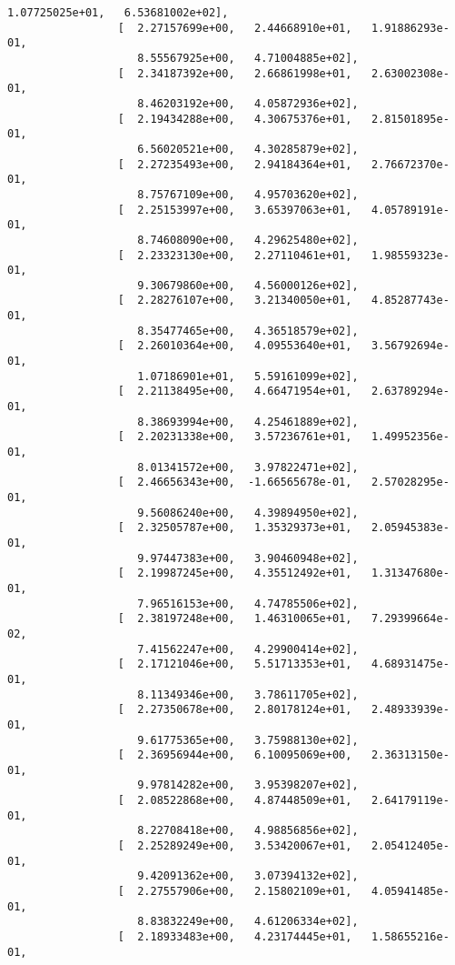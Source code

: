 \documentclass[11pt]{article}
\begin{document}
\begin{Verbatim}[commandchars=\\\{\}]
                    1.07725025e+01,   6.53681002e+02],
                 [  2.27157699e+00,   2.44668910e+01,   1.91886293e-01,
                    8.55567925e+00,   4.71004885e+02],
                 [  2.34187392e+00,   2.66861998e+01,   2.63002308e-01,
                    8.46203192e+00,   4.05872936e+02],
                 [  2.19434288e+00,   4.30675376e+01,   2.81501895e-01,
                    6.56020521e+00,   4.30285879e+02],
                 [  2.27235493e+00,   2.94184364e+01,   2.76672370e-01,
                    8.75767109e+00,   4.95703620e+02],
                 [  2.25153997e+00,   3.65397063e+01,   4.05789191e-01,
                    8.74608090e+00,   4.29625480e+02],
                 [  2.23323130e+00,   2.27110461e+01,   1.98559323e-01,
                    9.30679860e+00,   4.56000126e+02],
                 [  2.28276107e+00,   3.21340050e+01,   4.85287743e-01,
                    8.35477465e+00,   4.36518579e+02],
                 [  2.26010364e+00,   4.09553640e+01,   3.56792694e-01,
                    1.07186901e+01,   5.59161099e+02],
                 [  2.21138495e+00,   4.66471954e+01,   2.63789294e-01,
                    8.38693994e+00,   4.25461889e+02],
                 [  2.20231338e+00,   3.57236761e+01,   1.49952356e-01,
                    8.01341572e+00,   3.97822471e+02],
                 [  2.46656343e+00,  -1.66565678e-01,   2.57028295e-01,
                    9.56086240e+00,   4.39894950e+02],
                 [  2.32505787e+00,   1.35329373e+01,   2.05945383e-01,
                    9.97447383e+00,   3.90460948e+02],
                 [  2.19987245e+00,   4.35512492e+01,   1.31347680e-01,
                    7.96516153e+00,   4.74785506e+02],
                 [  2.38197248e+00,   1.46310065e+01,   7.29399664e-02,
                    7.41562247e+00,   4.29900414e+02],
                 [  2.17121046e+00,   5.51713353e+01,   4.68931475e-01,
                    8.11349346e+00,   3.78611705e+02],
                 [  2.27350678e+00,   2.80178124e+01,   2.48933939e-01,
                    9.61775365e+00,   3.75988130e+02],
                 [  2.36956944e+00,   6.10095069e+00,   2.36313150e-01,
                    9.97814282e+00,   3.95398207e+02],
                 [  2.08522868e+00,   4.87448509e+01,   2.64179119e-01,
                    8.22708418e+00,   4.98856856e+02],
                 [  2.25289249e+00,   3.53420067e+01,   2.05412405e-01,
                    9.42091362e+00,   3.07394132e+02],
                 [  2.27557906e+00,   2.15802109e+01,   4.05941485e-01,
                    8.83832249e+00,   4.61206334e+02],
                 [  2.18933483e+00,   4.23174445e+01,   1.58655216e-01,

\end{Verbatim}
\end{document}
